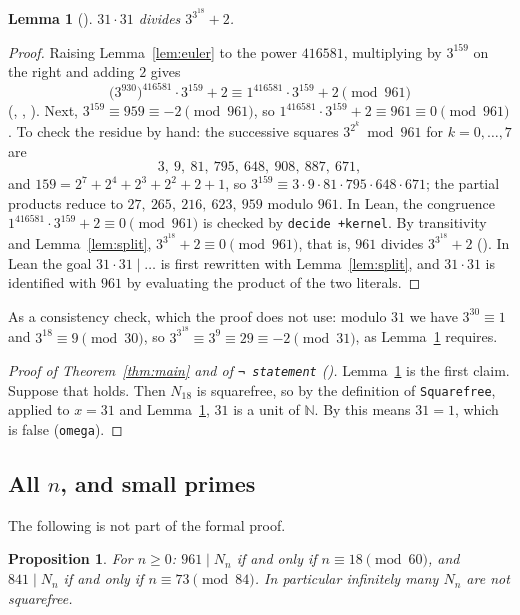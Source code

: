 \documentclass[11pt]{amsart}
\theoremstyle{plain}
\newtheorem{lemma}[theorem]{Lemma}
\newtheorem{proposition}[theorem]{Proposition}
\theoremstyle{definition}
\newcommand{\N}{\mathbb{N}}
\begin{document}
\begin{lemma}[]\label{lem:dvd}
$31\cdot31$ divides $3^{3^{18}}+2$.
\end{lemma}

\begin{proof}
Raising Lemma~\ref{lem:euler} to the power $416581$, multiplying by $3^{159}$ on the right and adding $2$ gives
\[
  \bigl(3^{930}\bigr)^{416581}\cdot3^{159}+2\equiv 1^{416581}\cdot3^{159}+2\pmod{961}
\]
(, , ).
Next, $3^{159}\equiv959\equiv-2\pmod{961}$, so $1^{416581}\cdot 3^{159}+2\equiv961\equiv0\pmod{961}$.
To check the residue by hand: the successive squares $3^{2^k}\bmod961$ for $k=0,\dots,7$ are
\[
  3,\ 9,\ 81,\ 795,\ 648,\ 908,\ 887,\ 671,
\]
and $159=2^7+2^4+2^3+2^2+2+1$, so $3^{159}\equiv3\cdot9\cdot81\cdot795\cdot648\cdot671$; the partial products reduce to $27,\ 265,\ 216,\ 623,\ 959$ modulo $961$.
In Lean, the congruence $1^{416581}\cdot3^{159}+2\equiv0\pmod{961}$ is checked by \texttt{decide +kernel}.
By transitivity and Lemma~\ref{lem:split}, $3^{3^{18}}+2\equiv0\pmod{961}$, that is, $961$ divides $3^{3^{18}}+2$ ().
In Lean the goal $31\cdot31\mid\dots$ is first rewritten with Lemma~\ref{lem:split}, and $31\cdot31$ is identified with $961$ by evaluating the product of the two literals.
\end{proof}

As a consistency check, which the proof does not use: modulo $31$ we have $3^{30}\equiv1$ and $3^{18}\equiv9\pmod{30}$, so $3^{3^{18}}\equiv3^9\equiv29\equiv-2\pmod{31}$, as Lemma~\ref{lem:dvd} requires.

\begin{proof}[Proof of Theorem~\ref{thm:main} and of \texttt{¬ statement} ()]
Lemma~\ref{lem:dvd} is the first claim.
Suppose that  holds. Then $N_{18}$ is squarefree, so by the definition of \texttt{Squarefree}, applied to $x=31$ and Lemma~\ref{lem:dvd}, $31$ is a unit of $\N$.
By  this means $31=1$, which is false (\texttt{omega}).
\end{proof}

\subsection*{All \texorpdfstring{$n$}{n}, and small primes}
The following is not part of the formal proof.

\begin{proposition}\label{prop:all}
For $n\ge0$: $961\mid N_n$ if and only if $n\equiv18\pmod{60}$, and $841\mid N_n$ if and only if $n\equiv73\pmod{84}$.
In particular infinitely many $N_n$ are not squarefree.
\end{proposition}
\end{document}
